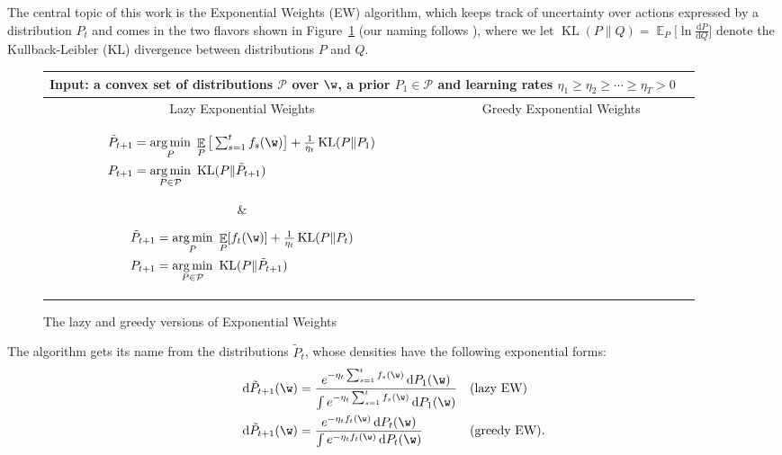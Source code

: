 \documentclass{colt2018} %
\DeclareMathOperator*{\E}{\mathbb{E}}
\DeclareMathOperator{\kl}{KL}
\DeclareMathOperator*{\argmin}{arg\,min}
\newcommand{\domainP}{\mathcal{P}}
\newcommand{\der}{\mathrm{d}}                   %
\newcommand*\dif{\mathop{}\!\textnormal{d}}
\begin{document}
The central topic of this work is the Exponential Weights (EW)
algorithm, which keeps track of uncertainty over actions expressed by a
distribution $P_t$ and comes in the two flavors shown in
Figure~\ref{alg:EW} (our naming follows \citet{zinkevich2003}), where
we let $\kl(P\|Q) = \E_{P}\big[ \ln \frac{\der P}{\der Q}
\big]$ denote the Kullback-Leibler (KL) divergence between distributions
$P$ and $Q$. 
% 
\begin{figure}
{%
\centering \small
\begin{tabular}{| c | c | r |}
\hline
\multicolumn{2}{|l|}{\textbf{Input:} a convex set of distributions
$\domainP$ over $\w$, a prior $P_1 \in \domainP$ and learning rates $\eta_1 \geq \eta_2 \geq \cdots \geq \eta_T > 0$} \\
\hline
Lazy Exponential Weights & Greedy Exponential Weights \\
\hline
\parbox{7.4cm}{\vspace{-0.35cm} \begin{equation*}
\begin{split}
    \tilde{P}_{t+1} & = \argmin_P ~ \E_P\big[\textstyle\sum_{s=1}^t f_s(\w)\big] + \frac{1}{\eta_{t}}\kl(P\|P_1) \\
    P_{t+1} & = \argmin_{P \in \domainP} ~ \kl(P\|\tilde{P}_{t+1})
% 
\end{split}
\end{equation*} \vspace{-0.35cm} } & \parbox{6cm}{\vspace{-0.35cm} \begin{equation*}
\begin{split}
    \tilde{P}_{t+1} &= \argmin_P ~ \E_P[f_t(\w)] +
    \tfrac{1}{\eta_{t}}\kl(P\|P_t)\\
    P_{t+1} & = \argmin_{P \in \domainP} ~ \kl(P\|\tilde{P}_{t+1}) %
% 
\end{split}
\end{equation*} \vspace{-0.35cm}} \\
\hline
\end{tabular}
}
\caption{The
lazy and greedy versions of Exponential Weights}
\label{alg:EW}
\end{figure}
% 
The algorithm gets its name from the distributions $\tilde{P}_t$, whose
densities have the following exponential forms:
% 
\begin{align}
\dif \tilde{P}_{t+1}(\w) &= \frac{e^{-\eta_t \sum_{s=1}^t f_s(\w)}\dif P_1(\w)}{\int e^{-\eta_t \sum_{s=1}^t f_s(\w)}\dif P_1(\w)}
&& \text{(lazy EW)}
\label{eq:lazy_EW}\\
\dif \tilde{P}_{t+1}(\w) &=
\frac{e^{-\eta_t f_t(\w)} \dif P_t(\w)}{\int e^{-\eta_t f_t(\w)} \dif
P_t(\w)} && \text{(greedy EW).}
\label{eq:greedy_EW}
\end{align}
\end{document}
